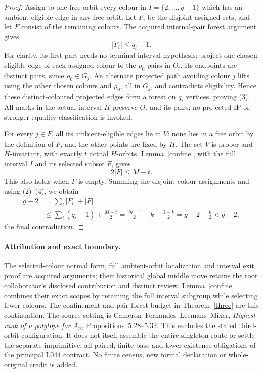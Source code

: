 \documentclass[11pt,a4paper]{article}
\begin{document}
\begin{proof}
Assign to one free orbit every colour in $I=\{2,\ldots,g-1\}$
which has an ambient-eligible edge in any free orbit. Let $F_i$
be the disjoint assigned sets, and let $F$ consist of the remaining
colours. The acquired internal-pair forest argument gives
\[
                         |F_i|\le q_i-1.               \tag{3}
\]
For clarity, its first part needs no terminal-interval hypothesis:
project one chosen eligible edge of each assigned colour to the
$\rho_0$-pairs in $O_i$. Its endpoints are distinct pairs, since
$\rho_0\in G_j$. An alternate projected path avoiding colour
$j$ lifts using the other chosen colours and $\rho_0$, all in
$G_j$, and contradicts eligibility. Hence these distinct-coloured
projected edges form a forest on $q_i$ vertices, proving (3).
All marks in the actual interval $H$ preserve $O_i$ and its pairs;
no projected IP or stronger equality classification is invoked.

For every $j\in F$, all its ambient-eligible edges lie in $V$:
none lies in a free orbit by the definition of $F$, and the other
points are fixed by $H$. The set $V$ is proper and $H$-invariant,
with exactly $t$ actual $H$-orbits. Lemma~\ref{confine}, with
the full interval $I$ and its selected subset $F$, gives
\[
                            2|F|\le M-t.                \tag{4}
\]
This also holds when $F$ is empty. Summing the disjoint colour
assignments and using (2)--(4), we obtain
\[
\begin{split}
g-2&=\sum_i |F_i|+|F|\\
&\le\sum_i(q_i-1)+\frac{M-t}{2}
 =\frac{2g-1}{2}-k-\frac{3-k}{2}
 =g-2-\frac{k}{2}<g-2,
\end{split}
\]
the final contradiction.
\end{proof}

\paragraph{Attribution and exact boundary.}
The selected-colour normal form, full ambient-orbit localization and
interval exit proof are acquired arguments; their historical global
middle move retains the root collaborator's disclosed contribution
and distinct review. Lemma~\ref{confine} combines their exact scopes
by retaining the full interval subgroup while selecting fewer colours.
The confinement and pair-forest budget in Theorem~\ref{three} are
this continuation. The source setting is Cameron--Fernandes--Leemans--Mixer,
\emph{Highest rank of a polytope for $A_n$}, Propositions~5.28--5.32.
This excludes the stated third-orbit configuration. It does not itself
assemble the entire singleton route or settle the separate imprimitive,
all-paired, finite-base and lower-existence obligations of the principal
L044 contract. No finite census, new formal declaration or whole-original
credit is added.
\end{document}

